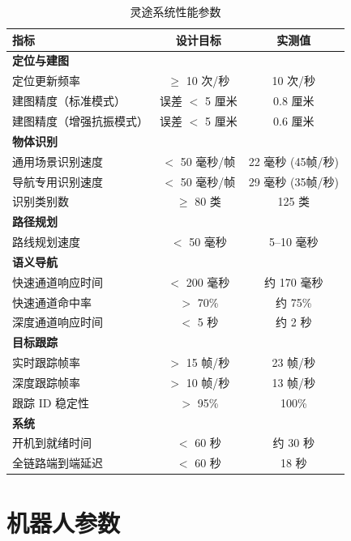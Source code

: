 \documentclass[a4paper, 12pt, openany]{book}
\begin{document}
\begin{table}[!htb]
\centering
\renewcommand{\arraystretch}{1.4}
\begin{tabularx}{\textwidth}{X c c}
  \toprule
  \textbf{指标} & \textbf{设计目标} & \textbf{实测值} \\
  \midrule
  \multicolumn{3}{l}{\textbf{定位与建图}} \\
  \quad 定位更新频率 & $\geq$ 10 次/秒 & 10 次/秒 \\
  \quad 建图精度（标准模式） & 误差 $<$ 5 厘米 & 0.8 厘米 \\
  \quad 建图精度（增强抗振模式） & 误差 $<$ 5 厘米 & 0.6 厘米 \\
  \midrule
  \multicolumn{3}{l}{\textbf{物体识别}} \\
  \quad 通用场景识别速度 & $<$ 50 毫秒/帧 & 22 毫秒 (45帧/秒) \\
  \quad 导航专用识别速度 & $<$ 50 毫秒/帧 & 29 毫秒 (35帧/秒) \\
  \quad 识别类别数 & $\geq$ 80 类 & 125 类 \\
  \midrule
  \multicolumn{3}{l}{\textbf{路径规划}} \\
  \quad 路线规划速度 & $<$ 50 毫秒 & 5--10 毫秒 \\
  \midrule
  \multicolumn{3}{l}{\textbf{语义导航}} \\
  \quad 快速通道响应时间 & $<$ 200 毫秒 & 约 170 毫秒 \\
  \quad 快速通道命中率 & $>$ 70\% & 约 75\% \\
  \quad 深度通道响应时间 & $<$ 5 秒 & 约 2 秒 \\
  \midrule
  \multicolumn{3}{l}{\textbf{目标跟踪}} \\
  \quad 实时跟踪帧率 & $>$ 15 帧/秒 & 23 帧/秒 \\
  \quad 深度跟踪帧率 & $>$ 10 帧/秒 & 13 帧/秒 \\
  \quad 跟踪 ID 稳定性 & $>$ 95\% & 100\% \\
  \midrule
  \multicolumn{3}{l}{\textbf{系统}} \\
  \quad 开机到就绪时间 & $<$ 60 秒 & 约 30 秒 \\
  \quad 全链路端到端延迟 & $<$ 60 秒 & 18 秒 \\
  \bottomrule
\end{tabularx}
\caption{灵途系统性能参数}
\end{table}

\section{机器人参数}
\end{document}
